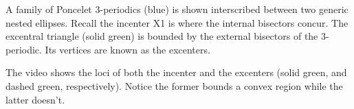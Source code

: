 A family of Poncelet 3-periodics (blue) is shown interscribed between two generic nested ellipses. Recall the incenter X1 is where the internal bisectors concur. The excentral triangle (solid green) is bounded by the external bisectors of the 3-periodic. Its vertices are known as the excenters. 

The video shows the loci of both the incenter and the excenters (solid green, and dashed green, respectively). Notice the former bounds a convex region while the latter doesn't.